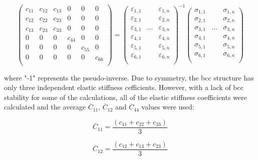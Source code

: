 \begin{equation}
\label{eq: hookes}
\begin{pmatrix}
	c_{11} & c_{12} & c_{13} & 0 & 0 & 0\\
	c_{12} & c_{22} & c_{23} & 0 & 0 & 0\\
	c_{13} & c_{23} & c_{33} & 0 & 0 & 0\\
	0 & 0 & 0 & c_{44} & 0 & 0\\
	0 & 0 & 0 & 0 &  c_{55} & 0\\
	0 & 0 & 0 & 0 & 0 & c_{66} \\    		
\end{pmatrix} =
\begin{pmatrix}
	\varepsilon_{1,1} & & \varepsilon_{1,n}\\
	\varepsilon_{2,1} & & \varepsilon_{2,n}\\
	\varepsilon_{3,1} & ... & \varepsilon_{3,n}\\
	\varepsilon_{4,1} & & \varepsilon_{4,n}\\
	\varepsilon_{5,1} & & \varepsilon_{5,n}\\
	\varepsilon_{6,1} & & \varepsilon_{6,n}\\					
\end{pmatrix}^{-1}
\begin{pmatrix}
	\sigma_{1,1} & & \sigma_{1,n}\\
	\sigma_{2,1} & & \sigma_{2,n}\\
	\sigma_{3,1} & ... & \sigma_{3,n}\\
	\sigma_{4,1} & & \sigma_{4,n}\\
	\sigma_{5,1} & & \sigma_{5,n}\\
	\sigma_{6,1} & & \sigma_{6,n}\\					
\end{pmatrix}
\end{equation}

\noindent where "-1" represents the pseudo-inverse. Due to symmetry, the bcc structure has only three independent elastic stiffness cefficients. However, with a lack of bcc stability for some of the calculations, all of the elastic stiffness coefficients were calculated and the average $\overline{C}_{11}$, $\overline{C}_{12}$ and $\overline{C}_{44}$ values were used:

\begin{equation}
\label{eq: averagec11}
\overline{C}_{11} = \frac{(c_{11} + c_{22} + c_{33})}{3}
\end{equation}

\begin{equation}
\label{eq: averagec12}
\overline{C}_{12} = \frac{(c_{12} + c_{13} + c_{23})}{3}
\end{equation}


